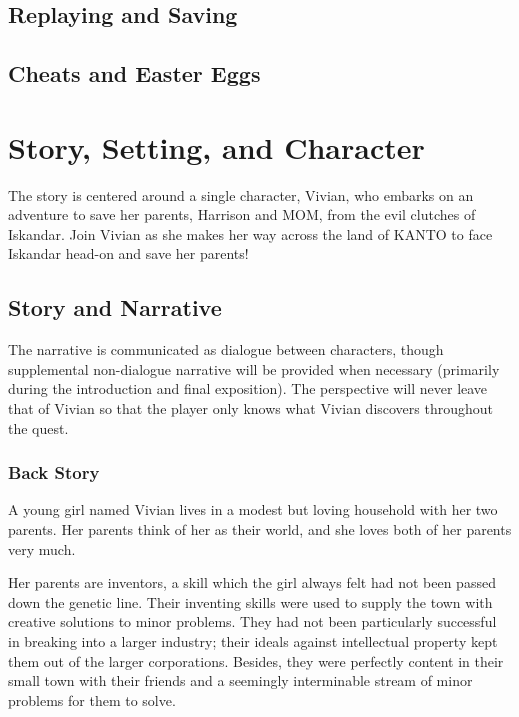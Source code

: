 \documentclass[12pt,titlepage]{article}
\newcommand\protagonist{Vivian\xspace}
\newcommand\dad{Harrison\xspace}
\newcommand\mom{MOM\xspace}
\newcommand\evilcorp{Iskandar\xspace}
\newcommand\world{KANTO\xspace}
\begin{document}
\subsection{Replaying and Saving}

\subsection{Cheats and Easter Eggs}

\newpage
\section{Story, Setting, and Character}

The story is centered around a single character, \protagonist, who embarks on an
adventure to save her parents, \dad and \mom, from the evil clutches of
\evilcorp. Join \protagonist as she makes her way across the land of \world to
face \evilcorp head-on and save her parents!

\subsection{Story and Narrative}

The narrative is communicated as dialogue between characters, though
supplemental non-dialogue narrative will be provided when necessary (primarily
during the introduction and final exposition). The perspective will never leave
that of \protagonist so that the player only knows what \protagonist discovers
throughout the quest.

\subsubsection{Back Story}

A young girl named Vivian lives in a modest but loving household with her two
parents. Her parents think of her as their world, and she loves both of her
parents very much.

Her parents are inventors, a skill which the girl always felt had not been
passed down the genetic line. Their inventing skills were used to supply the
town with creative solutions to minor problems. They had not been particularly
successful in breaking into a larger industry; their ideals against intellectual
property kept them out of the larger corporations. Besides, they were perfectly
content in their small town with their friends and a seemingly interminable
stream of minor problems for them to solve.
\end{document}

